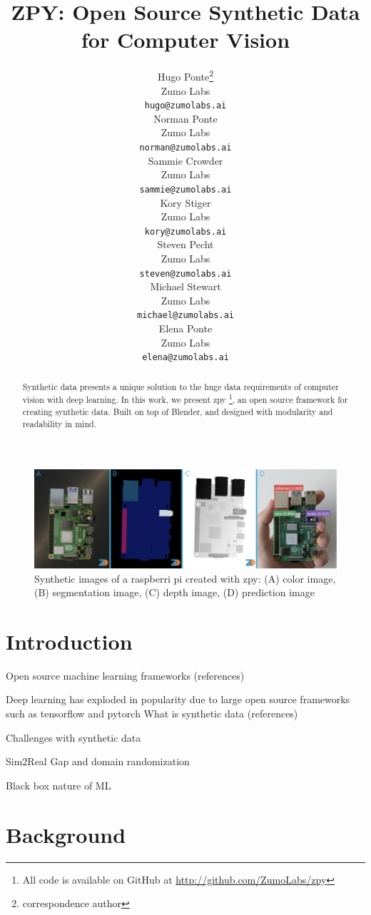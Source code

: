 \documentclass{article}
\title{ZPY: Open Source Synthetic Data for Computer Vision}
\author{
	{\hspace{1mm}Hugo Ponte}\thanks{correspondence author} \\ 
	Zumo Labs \\
	\texttt{hugo@zumolabs.ai} \\
	\And
	{\hspace{1mm}Norman Ponte} \\
	Zumo Labs \\
	\texttt{norman@zumolabs.ai} \\
	\And
	{\hspace{1mm}Sammie Crowder} \\
	Zumo Labs \\
	\texttt{sammie@zumolabs.ai} \\
	\And
	{\hspace{1mm}Kory Stiger} \\
	Zumo Labs \\
	\texttt{kory@zumolabs.ai} \\
	\And
	{\hspace{1mm}Steven Pecht} \\
	Zumo Labs \\
	\texttt{steven@zumolabs.ai} \\
	\And
	{\hspace{1mm}Michael Stewart} \\
	Zumo Labs \\
	\texttt{michael@zumolabs.ai} \\
	\And
	{\hspace{1mm}Elena Ponte} \\
	Zumo Labs \\
	\texttt{elena@zumolabs.ai} \\
}
\date{}
\begin{document}
\maketitle

\begin{abstract}
Synthetic data presents a unique solution to the huge data requirements of computer vision with deep learning. In this work, we present zpy \footnote{All code is available on GitHub at \url{http://github.com/ZumoLabs/zpy}}, an open source framework for creating synthetic data. Built on top of Blender, and designed with modularity and readability in mind.
\end{abstract}


\begin{figure}[!ht]
	\centering
	\includegraphics[width=\textwidth]{cover.png}
	\caption{Synthetic images of a raspberri pi created with zpy: (A) color image, (B) segmentation image, (C) depth image, (D) prediction image}
	\label{fig:fig1}
\end{figure}

\section{Introduction}
\label{sec:introduction}

Open source machine learning frameworks (references)

Deep learning has exploded in popularity due to large open source frameworks such as tensorflow and pytorch
What is synthetic data (references)

Challenges with synthetic data

Sim2Real Gap and domain randomization

Black box nature of ML

\section{Background}
\label{sec:background}
\end{document}
